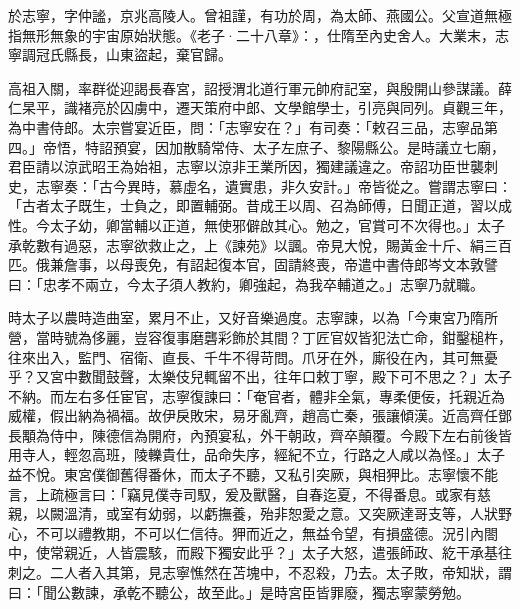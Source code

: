 
\begin{pinyinscope}

 於志寧，字仲謐，京兆高陵人。曾祖謹，有功於周，為太師、燕國公。父宣道無極指無形無象的宇宙原始狀態。《老子·二十八章》：，仕隋至內史舍人。大業末，志寧調冠氏縣長，山東盜起，棄官歸。



 高祖入關，率群從迎謁長春宮，詔授渭北道行軍元帥府記室，與殷開山參謀議。薛仁杲平，識褚亮於囚虜中，遷天策府中郎、文學館學士，引亮與同列。貞觀三年，為中書侍郎。太宗嘗宴近臣，問：「志寧安在？」有司奏：「敕召三品，志寧品第四。」帝悟，特詔預宴，因加散騎常侍、太子左庶子、黎陽縣公。是時議立七廟，君臣請以涼武昭王為始祖，志寧以涼非王業所因，獨建議違之。帝詔功臣世襲刺史，志寧奏：「古今異時，慕虛名，遺實患，非久安計。」帝皆從之。嘗謂志寧曰：「古者太子既生，士負之，即置輔弼。昔成王以周、召為師傅，日聞正道，習以成性。今太子幼，卿當輔以正道，無使邪僻啟其心。勉之，官賞可不次得也。」太子承乾數有過惡，志寧欲救止之，上《諫苑》以諷。帝見大悅，賜黃金十斤、絹三百匹。俄兼詹事，以母喪免，有詔起復本官，固請終喪，帝遣中書侍郎岑文本敦譬曰：「忠孝不兩立，今太子須人教約，卿強起，為我卒輔道之。」志寧乃就職。



 時太子以農時造曲室，累月不止，又好音樂過度。志寧諫，以為「今東宮乃隋所營，當時號為侈麗，豈容復事磨礱彩飾於其間？丁匠官奴皆犯法亡命，鉗鑿槌杵，往來出入，監門、宿衛、直長、千牛不得苛問。爪牙在外，廝役在內，其可無憂乎？又宮中數聞鼓聲，太樂伎兒輒留不出，往年口敕丁寧，殿下可不思之？」太子不納。而左右多任宦官，志寧復諫曰：「奄官者，體非全氣，專柔便佞，托親近為威權，假出納為禍福。故伊戾敗宋，易牙亂齊，趙高亡秦，張讓傾漢。近高齊任鄧長顒為侍中，陳德信為開府，內預宴私，外干朝政，齊卒顛覆。今殿下左右前後皆用寺人，輕忽高班，陵轢貴仕，品命失序，經紀不立，行路之人咸以為怪。」太子益不悅。東宮僕御舊得番休，而太子不聽，又私引突厥，與相狎比。志寧懷不能言，上疏極言曰：「竊見僕寺司馭，爰及獸醫，自春迄夏，不得番息。或家有慈親，以闕溫清，或室有幼弱，以虧撫養，殆非恕愛之意。又突厥達哥支等，人狀野心，不可以禮教期，不可以仁信待。狎而近之，無益令望，有損盛德。況引內閤中，使常親近，人皆震駭，而殿下獨安此乎？」太子大怒，遣張師政、紇干承基往刺之。二人者入其第，見志寧憔然在苫塊中，不忍殺，乃去。太子敗，帝知狀，謂曰：「聞公數諫，承乾不聽公，故至此。」是時宮臣皆罪廢，獨志寧蒙勞勉。




\end{pinyinscope}
